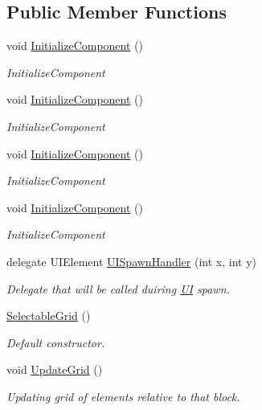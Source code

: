 \subsection*{Public Member Functions}
\begin{DoxyCompactItemize}
\item 
void \mbox{\hyperlink{class_wpf_handler_1_1_u_i_1_1_controls_1_1_selectable_grid_a3cfa1a512c14c55f2528c5d755a3373b}{Initialize\+Component}} ()
\begin{DoxyCompactList}\small\item\em Initialize\+Component \end{DoxyCompactList}\item 
void \mbox{\hyperlink{class_wpf_handler_1_1_u_i_1_1_controls_1_1_selectable_grid_a3cfa1a512c14c55f2528c5d755a3373b}{Initialize\+Component}} ()
\begin{DoxyCompactList}\small\item\em Initialize\+Component \end{DoxyCompactList}\item 
void \mbox{\hyperlink{class_wpf_handler_1_1_u_i_1_1_controls_1_1_selectable_grid_a3cfa1a512c14c55f2528c5d755a3373b}{Initialize\+Component}} ()
\begin{DoxyCompactList}\small\item\em Initialize\+Component \end{DoxyCompactList}\item 
void \mbox{\hyperlink{class_wpf_handler_1_1_u_i_1_1_controls_1_1_selectable_grid_a3cfa1a512c14c55f2528c5d755a3373b}{Initialize\+Component}} ()
\begin{DoxyCompactList}\small\item\em Initialize\+Component \end{DoxyCompactList}\item 
delegate U\+I\+Element \mbox{\hyperlink{class_wpf_handler_1_1_u_i_1_1_controls_1_1_selectable_grid_a62f02ab127d85228321df8aac18c67ac}{U\+I\+Spawn\+Handler}} (int x, int y)
\begin{DoxyCompactList}\small\item\em Delegate that will be called duiring \mbox{\hyperlink{namespace_wpf_handler_1_1_u_i}{UI}} spawn. \end{DoxyCompactList}\item 
\mbox{\hyperlink{class_wpf_handler_1_1_u_i_1_1_controls_1_1_selectable_grid_a3968411e99848235dfb6bdb7ec0f8fc5}{Selectable\+Grid}} ()
\begin{DoxyCompactList}\small\item\em Default constructor. \end{DoxyCompactList}\item 
void \mbox{\hyperlink{class_wpf_handler_1_1_u_i_1_1_controls_1_1_selectable_grid_a7b3c440a9ab67b44c9b6fc5911cbe07a}{Update\+Grid}} ()
\begin{DoxyCompactList}\small\item\em Updating grid of elements relative to that block. \end{DoxyCompactList}\end{DoxyCompactItemize}
